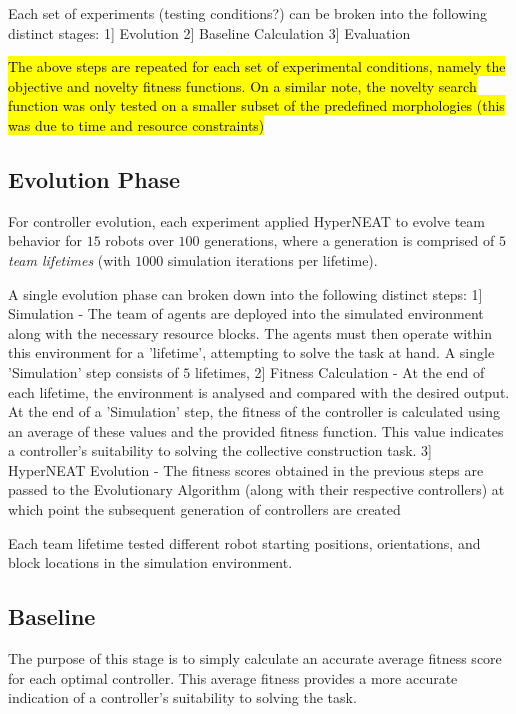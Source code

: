 Each set of experiments (testing conditions?) can be broken into the following distinct stages:
1] Evolution 
2] Baseline Calculation
3] Evaluation

\hl{The above steps are repeated for each set of experimental conditions, namely the objective and novelty fitness functions. On a similar note, the novelty search function was only tested on a smaller subset of the predefined morphologies (this was due to time and resource constraints)}


\subsection{Evolution Phase}

For controller evolution, each experiment applied HyperNEAT to evolve team behavior for
$15$ robots over $100$ generations,
where a generation is comprised of $5$ \textit{team lifetimes} (with $1000$ simulation iterations per lifetime).

A single evolution phase can broken down into the following distinct steps:
1] Simulation - The team of agents are deployed into the simulated environment along with the necessary resource blocks. The agents must then operate within this environment for a 'lifetime', attempting to solve the task at hand.  A single 'Simulation' step consists of $5$ lifetimes,
2] Fitness Calculation - At the end of each lifetime, the environment is analysed and compared with the desired output. At the end of a 'Simulation' step, the fitness of the controller is calculated using an average of these values and the provided fitness function. This value indicates a controller's suitability to solving the collective construction task.
3] HyperNEAT Evolution - The fitness scores obtained in the previous steps are passed to the Evolutionary Algorithm (along with their respective controllers) at which point the subsequent generation of controllers are created

Each team lifetime tested different robot starting positions, orientations, and block locations
in the simulation environment.


\subsection{Baseline}

The purpose of this stage is to simply calculate an accurate average fitness score for each optimal controller. This average fitness provides a more accurate indication of a controller's suitability to solving the task.

